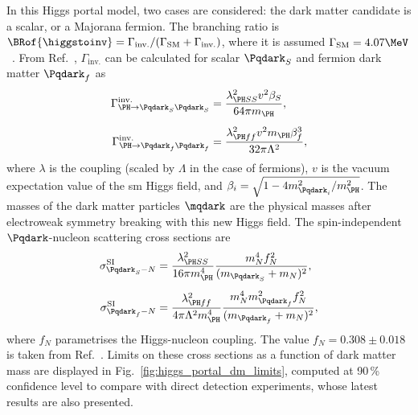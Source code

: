 In this Higgs portal model, two cases are considered: the dark matter candidate is a scalar, or a Majorana fermion. The branching ratio is $\BRof{\higgstoinv} = \Gamma_{\mathrm{inv.}}/(\Gamma_{\mathrm{SM}} + \Gamma_{\mathrm{inv.}})$, where it is assumed $\Gamma_{\mathrm{SM}} = \text{4.07}\MeV$~\cite{Heinemeyer:1559921}. From Ref.~, $\Gamma_{\mathrm{inv.}}$ can be calculated for scalar $\Pqdark_{S}$ and fermion dark matter $\Pqdark_{f}$ as
\begin{equation}
    \begin{aligned}
\Gamma^{\mathrm{inv.}}_{\PH \rightarrow \Pqdark_{S}\Pqdark_{S}} &= \frac{ \lambda^2_{\PH SS} v^2 \beta_S }{64\pi m_{\PH}},\\[0.5em]
\Gamma^{\mathrm{inv.}}_{\PH \rightarrow \Pqdark_{f}\Pqdark_{f}} &= \frac{ \lambda^2_{\PH ff} v^2 m_{\PH} \beta_f^3 }{ 32\pi \Lambda^2 },
    \end{aligned}
\end{equation}
where $\lambda$ is the coupling (scaled by $\Lambda$ in the case of fermions), $v$ is the vacuum expectation value of the \acrshort{sm} Higgs field, and $\beta_i = \sqrt{1 - 4m_{\Pqdark_i}^2/m_{\PH}^2}$. The masses of the dark matter particles $\mqdark$ are the physical masses after electroweak symmetry breaking with this new Higgs field. The spin-independent $\Pqdark$-nucleon scattering cross sections are
\begin{equation}
    \begin{aligned}
\sigma^{\mathrm{SI}}_{\Pqdark_{S}-N} &= \frac{\lambda^2_{\PH SS} }{ 16 \pi m_{\PH}^4} \frac{ m_N^4 f_N^2 }{ (m_{\Pqdark_{S}} + m_N)^2 },\\[0.5em]
\sigma^{\mathrm{SI}}_{\Pqdark_{f}-N} &= \frac{\lambda^2_{\PH ff} }{ 4 \pi \Lambda^2 m_{\PH}^4} \frac{ m_N^4 m_{\Pqdark_{f}}^2 f_N^2 }{ (m_{\Pqdark_{f}} + m_N)^2 },
    \end{aligned}
\end{equation}
where $f_N$ parametrises the Higgs-nucleon coupling. The value $f_N = \text{0.308} \pm \text{0.018}$ is taken from Ref.~. Limits on these cross sections as a function of dark matter mass are displayed in Fig.~\ref{fig:higgs_portal_dm_limits}, computed at 90\,\% confidence level to compare with direct detection experiments, whose latest results are also presented.

